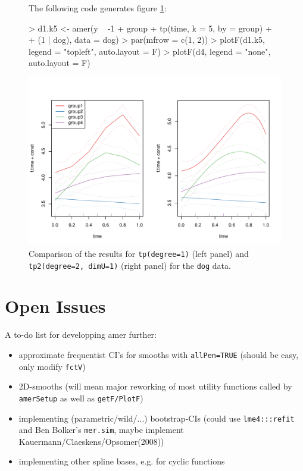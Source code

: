 \documentclass[12pt]{article}
\newenvironment{Schunk}{}{}
\newcommand{\code}[1]{\texttt{\small{#1}}}
\newcommand{\package}[1]{\textsf{\small{#1}}}
\begin{document}
\begin{figure}[!htbp]
The following code generates figure \ref{compareTPlot}:
\begin{center}
\begin{Schunk}
\begin{Sinput}
> d1.k5 <- amer(y ~ -1 + group + tp(time, k = 5, by = group) + 
+     (1 | dog), data = dog)
> par(mfrow = c(1, 2))
> plotF(d1.k5, legend = "topleft", auto.layout = F)
> plotF(d4, legend = "none", auto.layout = F)
\end{Sinput}
\end{Schunk}
\includegraphics{GAMMsUsingLME4-compareTPTPU}
\caption{Comparison of the results for \code{tp(degree=1)} (left panel) and 
\code{tp2(degree=2, dimU=1)} (right panel) for the \code{dog} data.
 \label{compareTPlot}}
\end{center}                    
\end{figure}    
 
\clearpage 
\section{Open Issues}

A to-do list for developping \package{amer} further:
\begin{itemize}
\item approximate frequentist CI's for smooths with \code{allPen=TRUE} (should be easy, only modify \code{fctV}) 
\item 2D-smooths (will mean major reworking of most
utility functions called by \code{amerSetup} as well as \code{getF/PlotF})
\item implementing (parametric/wild/...) bootstrap-CIs 
(could use \code{lme4:::refit} and Ben Bolker's  \code{mer.sim}, maybe implement
Kauermann/Claeskens/Opsomer(2008))
\item implementing other spline bases, e.g. for cyclic functions   
\end{itemize}


\end{document}
